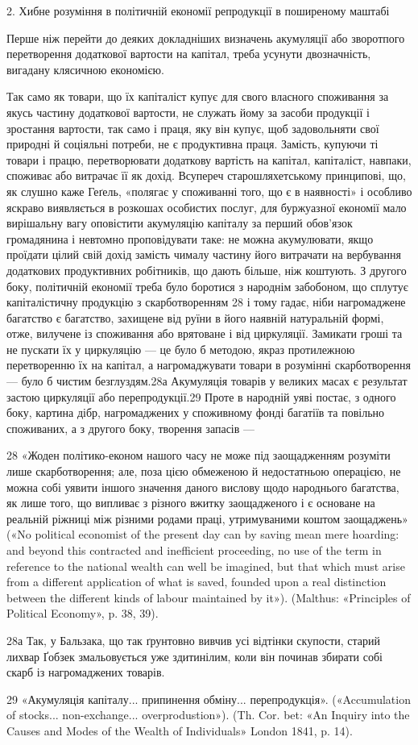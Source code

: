2. Хибне розуміння в політичній економії репродукції
в поширеному маштабі

Перше ніж перейти до деяких докладніших визначень акумуляції
або зворотпого перетворення додаткової вартости на капітал,
треба усунути двозначність, вигадану клясичною економією.

Так само як товари, що їх капіталіст купує для свого власного
споживання за якусь частину додаткової вартости, не служать
йому за засоби продукції і зростання вартости, так само і праця,
яку він купує, щоб задовольняти свої природні й соціяльні
потреби, не є продуктивна праця. Замість, купуючи ті товари
і працю, перетворювати додаткову вартість на капітал, капіталіст,
навпаки, споживає або витрачає її як дохід. Всупереч
старошляхетському принципові, що, як слушно каже Геґель,
«полягає у споживанні того, що є в наявності» і особливо яскраво
виявляється в розкошах особистих послуг, для буржуазної економії
мало вирішальну вагу оповістити акумуляцію капіталу за
перший обов’язок громадянина і невтомно проповідувати таке:
не можна акумулювати, якщо проїдати цілий свій дохід замість
чималу частину його витрачати на вербування додаткових продуктивних
робітників, що дають більше, ніж коштують. З другого
боку, політичній економії треба було боротися з народнім
забобоном, що сплутує капіталістичну продукцію з скарботворенням
28 і тому гадає, ніби нагромаджене багатство є багатство, захищене
від руїни в його наявній натуральній формі, отже, вилучене
із споживання або врятоване і від циркуляції. Замикати гроші
та не пускати їх у циркуляцію — це було б методою, якраз протилежною
перетворенню їх на капітал, а нагромаджувати товари
в розумінні скарботворення — було б чистим безглуздям.28а
Акумуляція товарів у великих масах є результат застою циркуляції
або перепродукції.29 Проте в народній уяві постає, з одного
боку, картина дібр, нагромаджених у споживному фонді багатіїв
та повільно споживаних, а з другого боку, творення запасів —

28 «Жоден політико-економ нашого часу не може під заощадженням
розуміти лише скарботворення; але, поза цією обмеженою й недостатньою
операцією, не можна собі уявити іншого значення даного
вислову щодо народнього багатства, як лише того, що випливає з різного
вжитку заощадженого і є основане на реальній ріжниці між різними
родами праці, утримуваними коштом заощаджень» («No political
economist of the present day can by saving mean mere hoarding: and
beyond this contracted and inefficient proceeding, no use of the term in reference
to the national wealth can well be imagined, but that which must
arise from a different application of what is saved, founded upon a real
distinction between the different kinds of labour maintained by it»).
(Malthus: «Principles of Political Economy», p. 38, 39).

28а Так, у Бальзака, що так ґрунтовно вивчив усі відтінки скупости,
старий лихвар Ґобзек змальовується уже здитинілим, коли він починав
збирати собі скарб із нагромаджених товарів.

29 «Акумуляція капіталу... припинення обміну... перепродукція».
(«Accumulation of stocks... non-exchange... overprodustion»). (Th. Cor.
bet: «An Inquiry into the Causes and Modes of the Wealth of Individuals» London
1841, p. 14).
